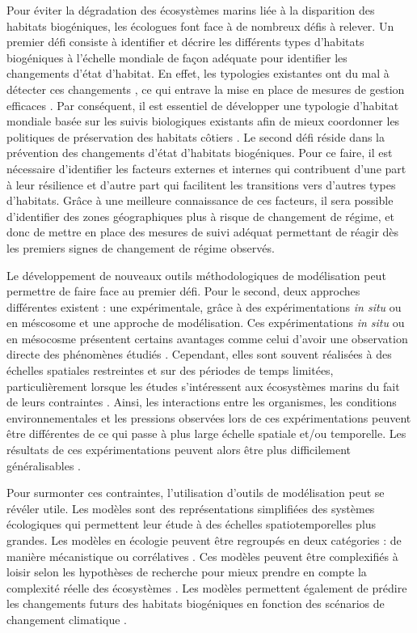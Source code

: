 Pour éviter la dégradation des écosystèmes marins liée à la disparition
des habitats biogéniques, les écologues font face à de nombreux défis à
relever. Un premier défi consiste à identifier et décrire les différents
types d'habitats biogéniques à l'échelle mondiale de façon adéquate pour
identifier les changements d'état d'habitat. En effet, les typologies
existantes ont du mal à détecter ces changements \autocite{Cooper_2019},
ce qui entrave la mise en place de mesures de gestion efficaces
\autocite{Ware_2020}. Par conséquent, il est essentiel de développer une
typologie d'habitat mondiale basée sur les suivis biologiques existants
\autocite{Cooper_2019} afin de mieux coordonner les politiques de
préservation des habitats côtiers \autocite{Ware_2020}. Le second défi
réside dans la prévention des changements d'état d'habitats biogéniques.
Pour ce faire, il est nécessaire d'identifier les facteurs externes et
internes qui contribuent d'une part à leur résilience et d'autre part
qui facilitent les transitions vers d'autres types d'habitats. Grâce à
une meilleure connaissance de ces facteurs, il sera possible
d'identifier des zones géographiques plus à risque de changement de
régime, et donc de mettre en place des mesures de suivi adéquat
permettant de réagir dès les premiers signes de changement de régime
observés.

Le développement de nouveaux outils méthodologiques de modélisation peut
permettre de faire face au premier défi. Pour le second, deux approches
différentes existent : une expérimentale, grâce à des expérimentations
\emph{in situ} ou en méscosome et une approche de modélisation. Ces
expérimentations \emph{in situ} ou en mésocosme présentent certains
avantages comme celui d'avoir une observation directe des phénomènes
étudiés \autocite{Fulton_2019}. Cependant, elles sont souvent réalisées
à des échelles spatiales restreintes et sur des périodes de temps
limitées, particulièrement lorsque les études s'intéressent aux
écosystèmes marins du fait de leurs contraintes \autocite{Witman_2015}.
Ainsi, les interactions entre les organismes, les conditions
environnementales et les pressions observées lors de ces
expérimentations peuvent être différentes de ce qui passe à plus large
échelle spatiale et/ou temporelle. Les résultats de ces expérimentations
peuvent alors être plus difficilement généralisables
\autocite{Witman_2015}.

Pour surmonter ces contraintes, l'utilisation d'outils de modélisation
peut se révéler utile. Les modèles sont des représentations simplifiées
des systèmes écologiques qui permettent leur étude à des échelles
spatiotemporelles plus grandes. Les modèles en écologie peuvent être
regroupés en deux catégories : de manière mécanistique ou corrélatives
\autocite{Kearney_2010}. Ces modèles peuvent être complexifiés à loisir
selon les hypothèses de recherche pour mieux prendre en compte la
complexité réelle des écosystèmes \autocite{Cartwright_2016}. Les
modèles permettent également de prédire les changements futurs des
habitats biogéniques en fonction des scénarios de changement climatique
\autocite{Curd_2023}.


